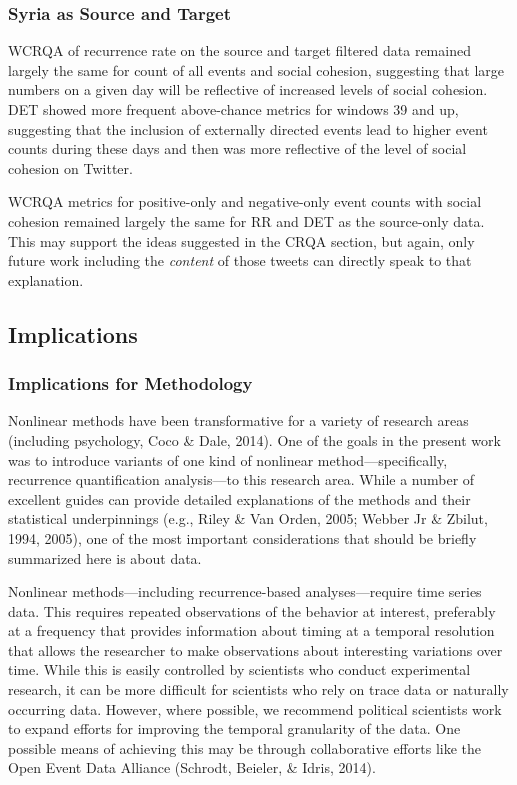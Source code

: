 \documentclass[english,man]{apa6}
\begin{document}
\hypertarget{syria-as-source-and-target-3}{%
\subsubsection{Syria as Source and Target}\label{syria-as-source-and-target-3}}

WCRQA of recurrence rate on the source and target filtered data remained
largely the same for count of all events and social cohesion, suggesting
that large numbers on a given day will be reflective of increased levels
of social cohesion. DET showed more frequent above-chance metrics
for windows 39 and up, suggesting that the inclusion of externally
directed events lead to higher event counts during these days and then
was more reflective of the level of social cohesion on Twitter.

WCRQA metrics for positive-only and negative-only event counts with
social cohesion remained largely the same for
RR and DET as the source-only data. This may support the ideas suggested
in the CRQA section, but again, only future work including the \emph{content}
of those tweets can directly speak to that explanation.

\hypertarget{implications}{%
\subsection{Implications}\label{implications}}

\hypertarget{implications-for-methodology}{%
\subsubsection{Implications for Methodology}\label{implications-for-methodology}}

Nonlinear methods have been transformative for a variety of research
areas (including psychology, Coco \& Dale, 2014). One of the goals in the
present work was to introduce variants of one kind of nonlinear
method---specifically, recurrence quantification analysis---to
this research area. While a number of excellent guides can provide
detailed explanations of the methods and their statistical underpinnings
(e.g., Riley \& Van Orden, 2005; Webber Jr \& Zbilut, 1994, 2005),
one of the most important considerations that should be briefly
summarized here is about data.

Nonlinear methods---including recurrence-based analyses---require
time series data. This requires repeated observations of the behavior
at interest, preferably at a frequency that provides information
about timing at a temporal resolution that allows the researcher to
make observations about interesting variations over time. While
this is easily controlled by scientists who conduct experimental
research, it can be more difficult for scientists who rely on
trace data or naturally occurring data. However, where possible,
we recommend political scientists work to expand efforts for
improving the temporal granularity of the data. One possible
means of achieving this may be through collaborative efforts
like the Open Event Data Alliance (Schrodt, Beieler, \& Idris, 2014).
\end{document}
